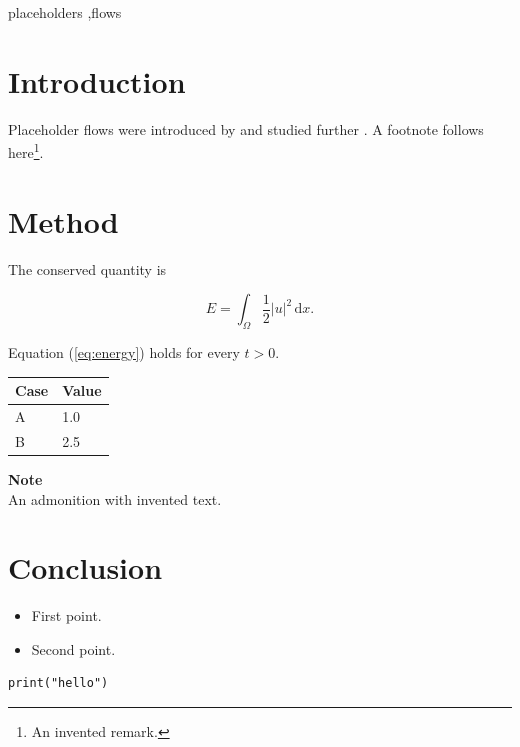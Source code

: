 \documentclass[a4paper,fleqn]{cas-sc}
\begin{document}





\begin{keywords}
placeholders \sep flows
\end{keywords}

\maketitle 

\printcredits

\doublespacing

\section{Introduction}

Placeholder flows were introduced by \cite{doe2020} and studied further \citep{doe2020}.
A footnote follows here\footnote{An invented remark.}.

\section{Method}

The conserved quantity is

\begin{equation}
\label{eq:energy}
E = \int_\Omega \frac{1}{2} |u|^2 \, \mathrm{d}x .
\end{equation}

Equation (\ref{eq:energy}) holds for every $t > 0$.

\bigskip\noindent
\begin{tabular}{p{}p{}}
\toprule
Case & Value \\
\hline
A & 1.0 \\
B & 2.5 \\
\bottomrule
\end{tabular}

\bigskip

\begin{framed}
\textbf{Note}\\
An admonition with invented text.
\end{framed}

\section{Conclusion}

\begin{itemize}
\item First point.
\item Second point.
\end{itemize}

\begin{verbatim}
print("hello")
\end{verbatim}


\newpage




\end{document}
